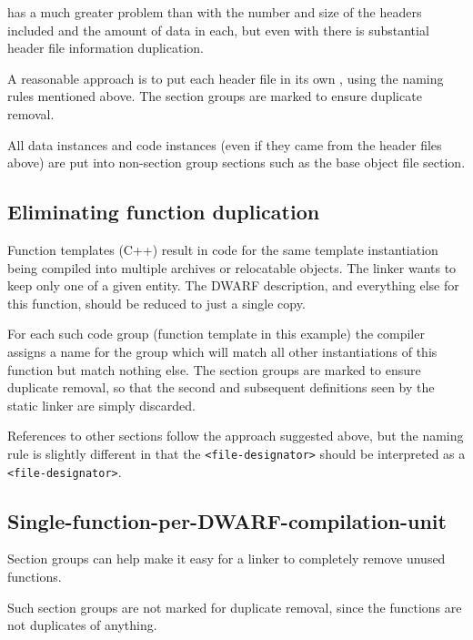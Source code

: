  has a much greater 
problem than 
 with the number and
size of the headers included and the amount of data in each,
but even with  
there is substantial header file information
duplication.

A reasonable approach is to put each header file in its own
, using the naming rules mentioned above. The
section groups are marked to ensure duplicate removal.

All data instances and code instances (even if they came
from the header files above) are put 
into non-section group
sections such as the base object file 
 section.

\subsection{Eliminating function duplication}
\label{app:eliminatingfunctionduplication}


Function templates (C++) result in code for the same template
instantiation being compiled into multiple archives or
relocatable objects. The linker wants to keep only one of a
given entity. The DWARF description, and everything else for
this function, should be reduced to just a single copy.

For each such code group (function template in this example)
the compiler assigns a name for the group which will match
all other instantiations of this function but match nothing
else. 
The 
section groups are marked to ensure duplicate
removal, so that the second and subsequent definitions seen
by the static linker are simply discarded.


References to other 
 sections follow the approach
suggested above, but the naming rule is slightly
different in that the \texttt{\textless file-designator\textgreater} 
should be interpreted as a \texttt{\textless file-designator\textgreater}.



\subsection{Single-function-per-DWARF-compilation-unit}
\label{app:singlefunctionperdwarfcompilationunit}

Section groups can help make it easy for a linker to completely
remove unused functions.

Such 
section groups are not marked for duplicate removal,
since the functions are not duplicates of anything.

